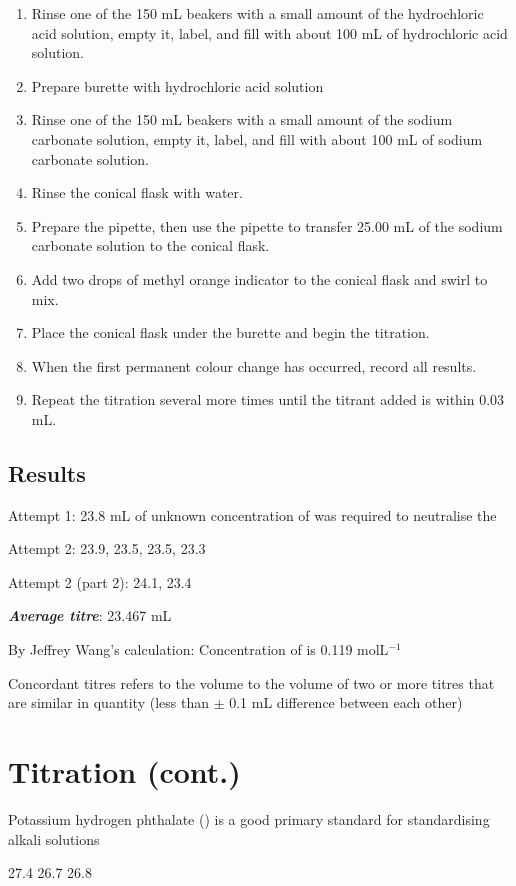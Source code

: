 		\begin{enumerate}
			\item Rinse one of the 150 mL beakers with a small amount of the hydrochloric acid solution, empty it, label, and fill with about 100 mL of hydrochloric acid solution.
			\item Prepare burette with hydrochloric acid solution
			\item Rinse one of the 150 mL beakers with a small amount of the sodium carbonate solution, empty it, label, and fill with about 100 mL of sodium carbonate solution.
			\item Rinse the conical flask with water.
			\item Prepare the pipette, then use the pipette to transfer 25.00 mL of the sodium carbonate solution to the conical flask.

			\item Add two drops of methyl orange indicator to the conical flask and swirl to mix. 
			\item Place the conical flask under the burette and begin the titration. 
			\item When the first permanent colour change has occurred, record all results. 
			\item Repeat the titration several more times until the titrant added is within 0.03 mL.
		\end{enumerate}

	\subsection{Results}
	
		Attempt 1: 23.8 mL of unknown concentration of  was required to neutralise the 

		Attempt 2: 23.9, 23.5, 23.5, 23.3
		
		Attempt 2 (part 2): 24.1, 23.4

		\textbf{\textit{Average titre}}: 23.467 mL

		By Jeffrey Wang's calculation: Concentration of  is 0.119 molL$^{-1}$
		
		Concordant titres refers to the volume to the volume of two or more titres that are similar in quantity (less than $\pm$ 0.1 mL difference between each other)

\section{Titration (cont.)}

	Potassium hydrogen phthalate () is a good primary standard for standardising alkali solutions

	\begin{center}
	\end{center}


	27.4
	26.7
	26.8
